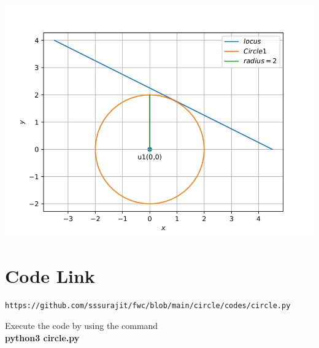 \documentclass[journal,12pt,twocolumn]{IEEEtran}
\begin{document}
    \centering
    \includegraphics[width=\columnwidth]{fig.jpg}
    \label{fig:my_label}
    
\section{\textbf{Code Link}}

\begin{lstlisting}
https://github.com/sssurajit/fwc/blob/main/circle/codes/circle.py
\end{lstlisting}
Execute the code by using the command
\\ \textbf{python3 circle.py}
    
\end{document}
